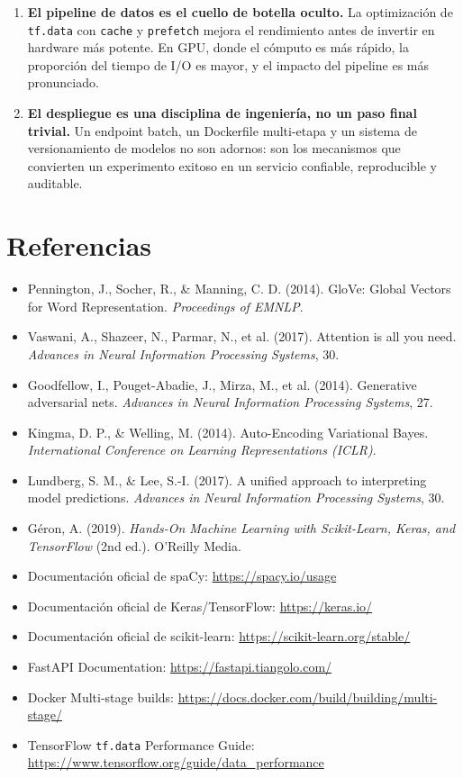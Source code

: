 \documentclass[12pt, a4paper]{article}
\begin{document}
\begin{enumerate}[leftmargin=*, label=\textbf{\arabic*.}]
  \item \textbf{El pipeline de datos es el cuello de botella oculto.} La optimización de \texttt{tf.data} con \texttt{cache} y \texttt{prefetch} mejora el rendimiento antes de invertir en hardware más potente. En GPU, donde el cómputo es más rápido, la proporción del tiempo de I/O es mayor, y el impacto del pipeline es más pronunciado.

  \item \textbf{El despliegue es una disciplina de ingeniería, no un paso final trivial.} Un endpoint batch, un Dockerfile multi-etapa y un sistema de versionamiento de modelos no son adornos: son los mecanismos que convierten un experimento exitoso en un servicio confiable, reproducible y auditable.

\end{enumerate}

\newpage
\section*{Referencias}

\begin{itemize}[leftmargin=*]
  \item Pennington, J., Socher, R., \& Manning, C. D. (2014). GloVe: Global Vectors for Word Representation. \textit{Proceedings of EMNLP}.
  \item Vaswani, A., Shazeer, N., Parmar, N., et al. (2017). Attention is all you need. \textit{Advances in Neural Information Processing Systems}, 30.
  \item Goodfellow, I., Pouget-Abadie, J., Mirza, M., et al. (2014). Generative adversarial nets. \textit{Advances in Neural Information Processing Systems}, 27.
  \item Kingma, D. P., \& Welling, M. (2014). Auto-Encoding Variational Bayes. \textit{International Conference on Learning Representations (ICLR)}.
  \item Lundberg, S. M., \& Lee, S.-I. (2017). A unified approach to interpreting model predictions. \textit{Advances in Neural Information Processing Systems}, 30.
  \item Géron, A. (2019). \textit{Hands-On Machine Learning with Scikit-Learn, Keras, and TensorFlow} (2nd ed.). O'Reilly Media.
  \item Documentación oficial de spaCy: \url{https://spacy.io/usage}
  \item Documentación oficial de Keras/TensorFlow: \url{https://keras.io/}
  \item Documentación oficial de scikit-learn: \url{https://scikit-learn.org/stable/}
  \item FastAPI Documentation: \url{https://fastapi.tiangolo.com/}
  \item Docker Multi-stage builds: \url{https://docs.docker.com/build/building/multi-stage/}
  \item TensorFlow \texttt{tf.data} Performance Guide: \url{https://www.tensorflow.org/guide/data_performance}
\end{itemize}
\end{document}
